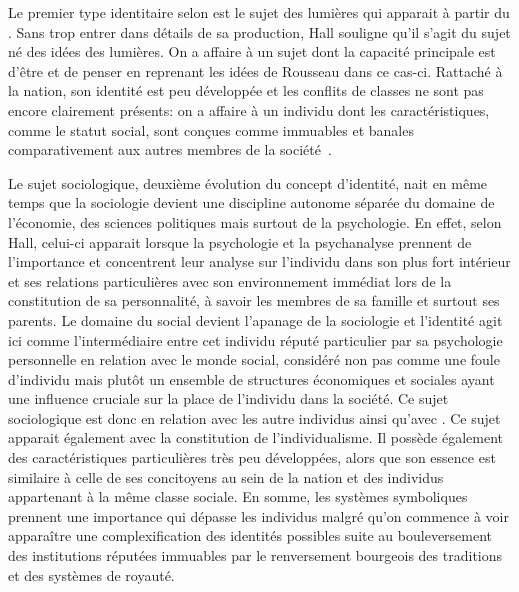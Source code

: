 Le premier type identitaire selon \citeauthor{Hall1996a} est le sujet des lumières qui apparait à partir du . 
Sans trop entrer dans détails de sa production, Hall souligne qu'il s'agit du sujet né des idées des lumières. 
On a affaire à un sujet dont la capacité principale est d'être et de penser en reprenant les idées de Rousseau dans ce cas-ci. 
Rattaché à la nation, son identité est peu développée et les conflits de classes ne sont pas encore clairement présents: on a affaire à un individu dont les caractéristiques, comme le statut social, sont conçues comme immuables et banales comparativement aux autres membres de la société~\citeyearpar[596]{Hall1996a}.

Le sujet sociologique, deuxième évolution du concept d'identité, nait en même temps que la sociologie devient une discipline autonome séparée du domaine de l'économie, des sciences politiques mais surtout de la psychologie. 
En effet, selon Hall, celui-ci apparait lorsque la psychologie et la psychanalyse prennent de l'importance et concentrent leur analyse sur l'individu dans son plus fort intérieur et ses relations particulières avec son environnement immédiat lors de la constitution de sa personnalité, à savoir les membres de sa famille et surtout ses parents. 
Le domaine du social devient l'apanage de la sociologie et l'identité agit ici comme l'intermédiaire entre cet individu réputé particulier par sa psychologie personnelle en relation avec le monde social, considéré non pas comme une foule d'individu mais plutôt un ensemble de structures économiques et sociales ayant une influence cruciale sur la place de l'individu dans la société. 
Ce sujet sociologique est donc en relation avec les autre individus ainsi qu'avec . 
Ce sujet apparait également avec la constitution de l'individualisme. 
Il possède également des caractéristiques particulières très peu développées, alors que son essence est similaire à celle de ses concitoyens au sein de la nation et des individus appartenant à la même classe sociale. 
En somme, les systèmes symboliques prennent une importance qui dépasse les individus malgré qu'on commence à voir apparaître une complexification des identités possibles suite au bouleversement des institutions réputées immuables par le renversement bourgeois des traditions et des systèmes de royauté. 

